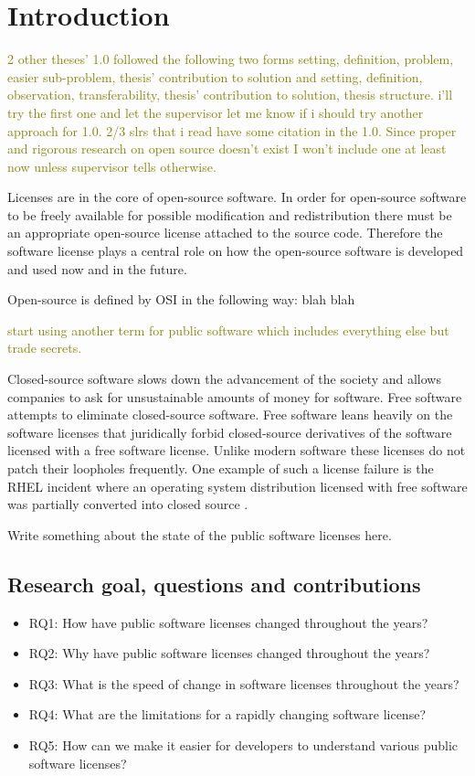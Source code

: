 \chapter{Introduction\label{intro}}

\textcolor{olive}{2 other theses' 1.0 followed the following two forms setting, definition, problem, easier sub-problem, thesis' contribution to solution and setting, definition, observation, transferability, thesis' contribution to solution, thesis structure. i'll try the first one and let the supervisor let me know if i should try another approach for 1.0. 2/3 slrs that i read have some citation in the 1.0. Since proper and rigorous research on open source doesn't exist I won't include one at least now unless supervisor tells otherwise.
}

Licenses are in the core of open-source software. In order for open-source software to be freely available for possible modification and redistribution there must be an appropriate open-source license attached to the source code. Therefore the software license plays a central role on how the open-source software is developed and used now and in the future.

Open-source is defined by OSI in the following way: blah blah

\textcolor{olive}{start using another term for public software which includes everything else but trade secrets.}

Closed-source software slows down the advancement of the society and allows companies to ask for unsustainable amounts of money for software. Free software attempts to eliminate closed-source software. Free software leans heavily on the software licenses that juridically forbid closed-source derivatives of the software licensed with a free software license. Unlike modern software these licenses do not patch their loopholes frequently. One example of such a license failure is the RHEL incident where an operating system distribution licensed with free software was partially converted into closed source \citep{ferguson2006gpl}.

Write something about the state of the public software licenses here.


\section{Research goal, questions and contributions}

\begin{itemize}
	\item RQ1: How have public software licenses changed throughout the years?
	\item RQ2: Why have public software licenses changed throughout the years?
	\item RQ3: What is the speed of change in software licenses throughout the years?
	\item RQ4: What are the limitations for a rapidly changing software license?
	\item RQ5: How can we make it easier for developers to understand various public software licenses?
\end{itemize}


